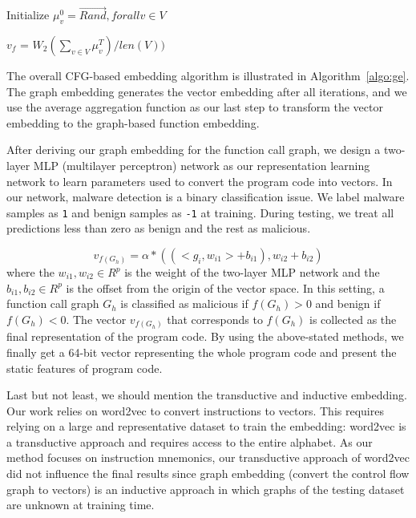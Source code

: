 \documentclass[runningheads]{llncs}
\begin{document}
\begin{algorithm}[t]
	\DontPrintSemicolon %
	Initialize $\mu_v^{0} = \vec{Rand}, for all v \in V$
	
	$v_f$ = $W_2(\sum_{v \in V} \mu_v^{T})/len(V))$
	
	\caption{Graph embedding}
	\label{algo:ge}
\end{algorithm}

The overall CFG-based embedding algorithm is illustrated in Algorithm~\ref{algo:ge}. The graph embedding generates the vector embedding after all iterations, and we use the average aggregation function as our last step to transform the vector embedding to the graph-based function embedding.
	
After deriving our graph embedding for the function call graph, we design a two-layer MLP (multilayer perceptron) network as our representation learning network to learn parameters used to convert the program code into vectors. In our network, malware detection is a binary classification issue. We label malware samples as \texttt{1} and benign samples as \texttt{-1} at training. During testing, we treat all predictions less than zero as benign and the rest as malicious.

\begin{equation}
\label{eq:detection}
v_{f(G_h)} = \alpha*((<g_i,w_{i1}> + b_{i1}),w_{i2} + b_{i2})
\end{equation}
%
where the $w_{i1}, w_{i2}\in R^p$ is the weight of the two-layer MLP network and the $b_{i1}, b_{i2}\in R^p$ is the offset from the origin of the vector space. In this setting, a function call graph $G_h$ is classified as malicious if $f(G_h) > 0$ and benign if $f(G_h) < 0$. The vector $v_{f(G_h)}$ that corresponds to $f(G_h)$ is collected as the final representation of the program code. By using the above-stated methods, we finally get a 64-bit vector representing the whole program code and present the static features of program code.

Last but not least, we should mention the transductive and inductive embedding. Our work relies on word2vec to convert instructions to vectors. This requires relying on a large and representative dataset
to train the embedding: word2vec is a transductive approach and requires access to the entire alphabet. As our method focuses on instruction mnemonics, our transductive approach of word2vec did not influence the final results since graph embedding (convert the control flow graph to vectors) is an inductive approach in which graphs of the testing dataset are unknown at training time. 
\end{document}

